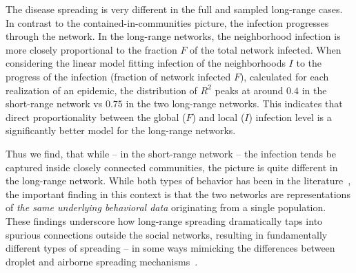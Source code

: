 \documentclass[fleqn,10pt]{wlscirep}
\begin{document}
The disease spreading is very different in the full and sampled long-range cases. 
In contrast to the contained-in-communities picture, the infection progresses  through the network.
In the long-range networks, the neighborhood infection is more closely proportional to the fraction $F$ of the total network infected.
When considering the  linear model fitting infection of the neighborhoods $I$ to the progress of the infection (fraction of network infected $F$), calculated for each realization of an epidemic, the distribution of $R^2$ peaks at around $0.4$ in the short-range network vs $0.75$ in the two long-range networks.
This indicates that direct proportionality between the global ($F$) and local ($I$) infection level is a significantly better model for the long-range networks.

Thus we find, that while -- in the short-range network -- the infection tends be captured inside closely connected communities, the picture is quite different in the long-range network. 
While both types of behavior has been  in the literature~\cite{read2008dynamic, fowler2008dynamic, mucha2010community, salathe2010dynamics, karsai2011small, cauchemez2011role, xiao2016clustering}, the important finding in this context is that the two networks are representations of \textit{the same underlying behavioral data} originating from a single population. 
These findings underscore how long-range spreading dramatically taps into spurious connections outside the social networks, resulting in fundamentally different types of spreading -- in some ways mimicking the differences between droplet and airborne spreading mechanisms~\cite{garner1996guideline, weinstein2003transmission, klovdahl2001networks, liverman2007preparing}.
\end{document}
